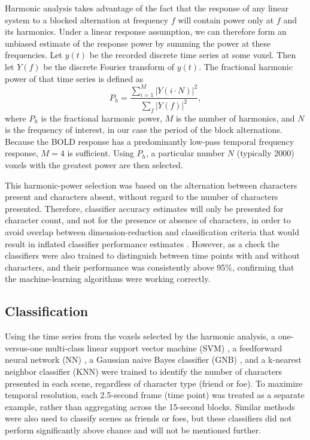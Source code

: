 \documentclass[5p,authoryear]{elsarticle}
\begin{document}
Harmonic analysis takes advantage of the fact that the response of any linear system to a blocked alternation at frequency $f$ will contain power only at $f$ and its harmonics. 
Under a linear response assumption, we can therefore form an unbiased estimate of the response power by summing the power at these frequencies. 
Let $y(t)$ be the recorded discrete time series at some voxel.
Then let $Y(f)$ be the discrete Fourier transform of $y(t)$.
The fractional harmonic power of that time series is defined as
\begin{equation}
P_h = \frac{\sum_{i = 1}^{M}{\left|Y(i \cdot N)\right|^{2}}}{\sum_{f}{\left|Y(f)\right|^{2}}},
\end{equation}
where $P_h$ is the fractional harmonic power, $M$ is the number of harmonics, and $N$ is the frequency of interest, in our case the period of the block alternations. 
Because the BOLD response has a predominantly low-pass temporal frequency response, $M = 4$ is sufficient. 
Using $P_h$, a particular number $N$ (typically 2000) voxels with the greatest power are then selected. 

This harmonic-power selection was based on the alternation between characters present and characters absent, without regard to the number of characters presented. 
Therefore, classifier accuracy estimates will only be presented for character count, and not for the presence or absence of characters, in order to avoid overlap between dimension-reduction and  classification criteria that would result in inflated classifier performance estimates \citep{Pereira2009}.
However, as a check the classifiers were also trained to distinguish between time points with and without characters, and their performance was consistently above 95\%, confirming that the machine-learning algorithms were working correctly.

\subsection{Classification}
Using the time series from the voxels selected by the harmonic analysis, a one-versus-one multi-class linear support vector machine (SVM) \citep{Cortes1995,Weston1999}, a feedforward neural network (NN) \citep{Hornik1989,Hagan1994}, a Gaussian naive Bayes classifier (GNB) \citep{Duda1973}, and a k-nearest neighbor classifier (KNN) \citep{Cover1967} were trained to identify the number of characters presented in each scene, regardless of character type (friend or foe).
To maximize temporal resolution, each 2.5-second frame (time point) was treated as a separate example, rather than aggregating across the 15-second blocks.
Similar methods were also used to classify scenes as friends or foes, but these classifiers did not perform significantly above chance and will not be mentioned further.
\end{document}
